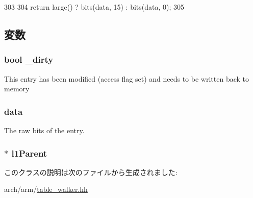 \begin{DoxyCode}
303         {
304             return large() ? bits(data, 15) : bits(data, 0);
305         }
\end{DoxyCode}


\subsection{変数}
\hypertarget{classArmISA_1_1TableWalker_1_1L2Descriptor_ad9d7d92a6dc33a9bf186020af3053844}{
\subsubsection[{\_\-dirty}]{\setlength{\rightskip}{0pt plus 5cm}bool {\bf \_\-dirty}}}
\label{classArmISA_1_1TableWalker_1_1L2Descriptor_ad9d7d92a6dc33a9bf186020af3053844}
This entry has been modified (access flag set) and needs to be written back to memory \hypertarget{classArmISA_1_1TableWalker_1_1L2Descriptor_a1e43bf7d608e87228b625cca2c04d641}{
\subsubsection[{data}]{ {\bf data}}}
\label{classArmISA_1_1TableWalker_1_1L2Descriptor_a1e43bf7d608e87228b625cca2c04d641}
The raw bits of the entry. \hypertarget{classArmISA_1_1TableWalker_1_1L2Descriptor_a8aab1be246193678f0ae9e775e535c53}{
\subsubsection[{l1Parent}]{$\ast$ {\bf l1Parent}}}
\label{classArmISA_1_1TableWalker_1_1L2Descriptor_a8aab1be246193678f0ae9e775e535c53}


このクラスの説明は次のファイルから生成されました:\begin{DoxyCompactItemize}
\item 
arch/arm/\hyperlink{table__walker_8hh}{table\_\-walker.hh}\end{DoxyCompactItemize}
